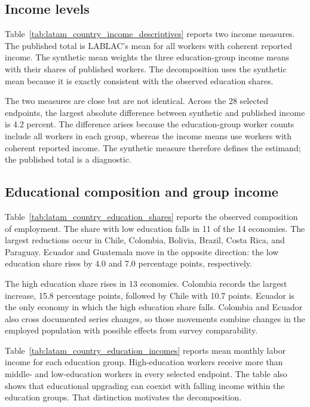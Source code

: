 \documentclass[11pt]{article}
\begin{document}
\subsection{Income levels}

Table~\ref{tab:latam_country_income_descriptives} reports two income measures.
The published total is LABLAC's mean for all workers with coherent reported
income. The synthetic mean weights the three education-group income means
with their shares of published workers. The decomposition uses the synthetic
mean because it is exactly consistent with the observed education shares.



The two measures are close but are not identical. Across the 28 selected
endpoints, the largest absolute difference between synthetic and published
income is 4.2 percent. The difference arises because the education-group
worker counts include all workers in each group, whereas the income means use
workers with coherent reported income. The synthetic measure therefore
defines the estimand; the published total is a diagnostic.

\subsection{Educational composition and group income}

Table~\ref{tab:latam_country_education_shares} reports the observed composition
of employment. The share with low education falls in 11 of the 14 economies.
The largest reductions occur in Chile, Colombia, Bolivia, Brazil, Costa Rica,
and Paraguay. Ecuador and Guatemala move in the opposite direction: the low
education share rises by 4.0 and 7.0 percentage points, respectively.



The high education share rises in 13 economies. Colombia records the largest
increase, 15.8 percentage points, followed by Chile with 10.7 points. Ecuador
is the only economy in which the high education share falls. Colombia and
Ecuador also cross documented series changes, so those movements combine
changes in the employed population with possible effects from survey
comparability.

Table~\ref{tab:latam_country_education_incomes} reports mean monthly labor
income for each education group. High-education workers receive more than
middle- and low-education workers in every selected endpoint. The table also
shows that educational upgrading can coexist with falling income within the
education groups. That distinction motivates the decomposition.
\end{document}
